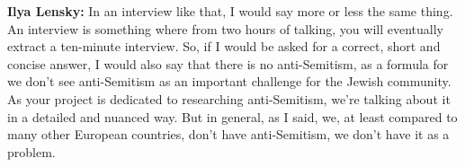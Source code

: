 \textbf{Ilya Lensky:} In an interview like that, I would say more or less the same thing. An interview is something where from two hours of talking, you will eventually extract a ten-minute interview. So, if I would be asked for a correct, short and concise answer, I would also say that there is no anti-Semitism, as a formula for we don’t see anti-Semitism as an important challenge for the Jewish community. As your project is dedicated to researching anti-Semitism, we’re talking about it in a detailed and nuanced way. But in general, as I said, we, at least compared to many other European countries, don’t have anti-Semitism, we don’t have it as a problem.